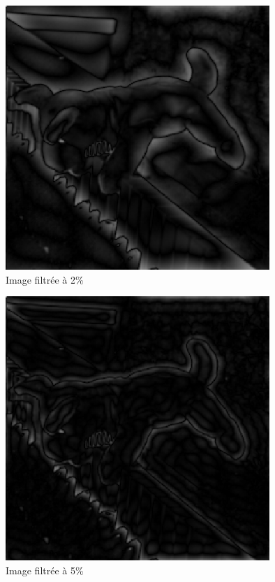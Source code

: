 \documentclass[a4paper]{article}
\begin{document}
\begin{figure}[!ht]
    \center
    \includegraphics[width=10cm]{../images/evert_filtre_02.eps}
    \caption{Image filtrée à 2\%}
\end{figure}

\begin{figure}[!ht]
    \center
    \includegraphics[width=10cm]{../images/evert_filtre_05.eps}
    \caption{Image filtrée à 5\%}
\end{figure}
\end{document}
